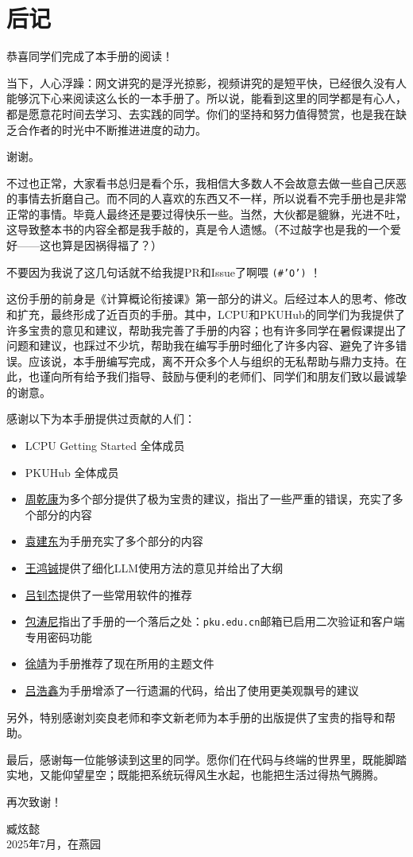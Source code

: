 \chapter{后记}

恭喜同学们完成了本手册的阅读！

当下，人心浮躁：网文讲究的是浮光掠影，视频讲究的是短平快，已经很久没有人能够沉下心来阅读这么长的一本手册了。所以说，能看到这里的同学都是有心人，都是愿意花时间去学习、去实践的同学。你们的坚持和努力值得赞赏，也是我在缺乏合作者的时光中不断推进进度的动力。

谢谢。

不过也正常，大家看书总归是看个乐，我相信大多数人不会故意去做一些自己厌恶的事情去折磨自己。而不同的人喜欢的东西又不一样，所以说看不完手册也是非常正常的事情。毕竟人最终还是要过得快乐一些。当然，大伙都是貔貅，光进不吐，这导致整本书的内容全都是我手敲的，真是令人遗憾。（不过敲字也是我的一个爱好——这也算是因祸得福了？）

不要因为我说了这几句话就不给我提PR和Issue了啊喂 \texttt{(\#'O')} ！

这份手册的前身是《计算概论衔接课》第一部分的讲义。后经过本人的思考、修改和扩充，最终形成了近百页的手册。其中，LCPU和PKUHub的同学们为我提供了许多宝贵的意见和建议，帮助我完善了手册的内容；也有许多同学在暑假课提出了问题和建议，也踩过不少坑，帮助我在编写手册时细化了许多内容、避免了许多错误。应该说，本手册编写完成，离不开众多个人与组织的无私帮助与鼎力支持。在此，也谨向所有给予我们指导、鼓励与便利的老师们、同学们和朋友们致以最诚挚的谢意。

感谢以下为本手册提供过贡献的人们：
\begin{itemize}
  \item LCPU Getting Started 全体成员
  \item PKUHub 全体成员
  \item \faGithub\href{https://github.com/wszqkzqk}{周乾康}为多个部分提供了极为宝贵的建议，指出了一些严重的错误，充实了多个部分的内容
  \item \faGithub\href{https://github.com/yjdyamv}{袁建东}为手册充实了多个部分的内容
  \item \faGithub\href{https://github.com/whcpumpkin}{王鸿铖}提供了细化LLM使用方法的意见并给出了大纲
  \item \faGithub\href{https://github.com/Elkeid-me}{吕钊杰}提供了一些常用软件的推荐
  \item \faGithub\href{https://github.com/AsTonyshment}{包涛尼}指出了手册的一个落后之处：\texttt{pku.edu.cn}邮箱已启用二次验证和客户端专用密码功能
  \item \faGithub\href{https://github.com/ICUlizhi}{徐靖}为手册推荐了现在所用的主题文件
  \item \faGithub\href{https://github.com/ha0xin}{吕浩鑫}为手册增添了一行遗漏的代码，给出了使用更美观飘号的建议
\end{itemize}

另外，特别感谢刘奕良老师和李文新老师为本手册的出版提供了宝贵的指导和帮助。

最后，感谢每一位能够读到这里的同学。愿你们在代码与终端的世界里，既能脚踏实地，又能仰望星空；既能把系统玩得风生水起，也能把生活过得热气腾腾。

再次致谢！

\vspace{2em}
\begin{flushright}
  臧炫懿 \\
  2025年7月，在燕园
\end{flushright}